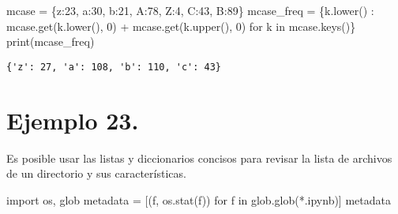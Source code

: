 \documentclass[
  letterpaper,
  DIV=11,
  numbers=noendperiod]{scrreprt}
\newenvironment{Shaded}{\begin{snugshade}}{\end{snugshade}}
\newcommand{\BuiltInTok}[1]{\textcolor[rgb]{0.00,0.23,0.31}{#1}}
\newcommand{\ControlFlowTok}[1]{\textcolor[rgb]{0.00,0.23,0.31}{#1}}
\newcommand{\DecValTok}[1]{\textcolor[rgb]{0.68,0.00,0.00}{#1}}
\newcommand{\ImportTok}[1]{\textcolor[rgb]{0.00,0.46,0.62}{#1}}
\newcommand{\KeywordTok}[1]{\textcolor[rgb]{0.00,0.23,0.31}{#1}}
\newcommand{\NormalTok}[1]{\textcolor[rgb]{0.00,0.23,0.31}{#1}}
\newcommand{\OperatorTok}[1]{\textcolor[rgb]{0.37,0.37,0.37}{#1}}
\newcommand{\StringTok}[1]{\textcolor[rgb]{0.13,0.47,0.30}{#1}}
\begin{document}
\begin{Shaded}
\begin{Highlighting}[]
\NormalTok{mcase }\OperatorTok{=}\NormalTok{ \{}\StringTok{\textquotesingle{}z\textquotesingle{}}\NormalTok{:}\DecValTok{23}\NormalTok{, }\StringTok{\textquotesingle{}a\textquotesingle{}}\NormalTok{:}\DecValTok{30}\NormalTok{, }\StringTok{\textquotesingle{}b\textquotesingle{}}\NormalTok{:}\DecValTok{21}\NormalTok{, }\StringTok{\textquotesingle{}A\textquotesingle{}}\NormalTok{:}\DecValTok{78}\NormalTok{, }\StringTok{\textquotesingle{}Z\textquotesingle{}}\NormalTok{:}\DecValTok{4}\NormalTok{, }\StringTok{\textquotesingle{}C\textquotesingle{}}\NormalTok{:}\DecValTok{43}\NormalTok{, }\StringTok{\textquotesingle{}B\textquotesingle{}}\NormalTok{:}\DecValTok{89}\NormalTok{\}}
\NormalTok{mcase\_freq }\OperatorTok{=}\NormalTok{ \{k.lower() : }
\NormalTok{              mcase.get(k.lower(), }\DecValTok{0}\NormalTok{) }\OperatorTok{+}\NormalTok{ mcase.get(k.upper(), }\DecValTok{0}\NormalTok{)}
              \ControlFlowTok{for}\NormalTok{ k }\KeywordTok{in}\NormalTok{ mcase.keys()\}}
\BuiltInTok{print}\NormalTok{(mcase\_freq)}
\end{Highlighting}
\end{Shaded}

\begin{verbatim}
{'z': 27, 'a': 108, 'b': 110, 'c': 43}
\end{verbatim}

\section{\texorpdfstring{\textbf{Ejemplo
23.}}{Ejemplo 23.}}\label{ejemplo-23.}

Es posible usar las listas y diccionarios concisos para revisar la lista
de archivos de un directorio y sus características.

\begin{Shaded}
\begin{Highlighting}[]
\ImportTok{import}\NormalTok{ os, glob}
\NormalTok{metadata }\OperatorTok{=}\NormalTok{ [(f, os.stat(f)) }\ControlFlowTok{for}\NormalTok{ f }\KeywordTok{in}\NormalTok{ glob.glob(}\StringTok{\textquotesingle{}*.ipynb\textquotesingle{}}\NormalTok{)]}
\NormalTok{metadata}
\end{Highlighting}
\end{Shaded}
\end{document}
